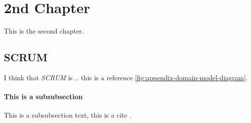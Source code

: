 \chapter{2nd Chapter}
\label{chapter:2ndchapter}

This is the second chapter.

\section{SCRUM}
I think that \emph{SCRUM} is .. this is a reference \cref{fig:appendix-domain-model-diagram}.

\subsubsection{This is a subsubsection}
This is a subsubsection text, this is a cite \cite{connolly2023database}.